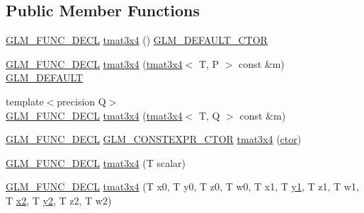 \subsection*{Public Member Functions}
\begin{DoxyCompactItemize}
\item 
\mbox{\hyperlink{setup_8hpp_ab2d052de21a70539923e9bcbf6e83a51}{G\+L\+M\+\_\+\+F\+U\+N\+C\+\_\+\+D\+E\+CL}} \mbox{\hyperlink{structglm_1_1tmat3x4_a2bef718978c799d94cb376b64e9cdfd1}{tmat3x4}} () \mbox{\hyperlink{setup_8hpp_afb97a4e995bc004c0cbbfa22125b80ba}{G\+L\+M\+\_\+\+D\+E\+F\+A\+U\+L\+T\+\_\+\+C\+T\+OR}}
\item 
\mbox{\hyperlink{setup_8hpp_ab2d052de21a70539923e9bcbf6e83a51}{G\+L\+M\+\_\+\+F\+U\+N\+C\+\_\+\+D\+E\+CL}} \mbox{\hyperlink{structglm_1_1tmat3x4_ab424019515d481478f47bac3d055f621}{tmat3x4}} (\mbox{\hyperlink{structglm_1_1tmat3x4}{tmat3x4}}$<$ T, P $>$ const \&m) \mbox{\hyperlink{setup_8hpp_aefce7051c376a64ba89fa93a9f63bc2c}{G\+L\+M\+\_\+\+D\+E\+F\+A\+U\+LT}}
\item 
{\footnotesize template$<$precision Q$>$ }\\\mbox{\hyperlink{setup_8hpp_ab2d052de21a70539923e9bcbf6e83a51}{G\+L\+M\+\_\+\+F\+U\+N\+C\+\_\+\+D\+E\+CL}} \mbox{\hyperlink{structglm_1_1tmat3x4_a7bb59eb4a55a89437df372f9cc6389e1}{tmat3x4}} (\mbox{\hyperlink{structglm_1_1tmat3x4}{tmat3x4}}$<$ T, Q $>$ const \&m)
\item 
\mbox{\hyperlink{setup_8hpp_ab2d052de21a70539923e9bcbf6e83a51}{G\+L\+M\+\_\+\+F\+U\+N\+C\+\_\+\+D\+E\+CL}} \mbox{\hyperlink{setup_8hpp_ad34178a09666081abdb573c14d1f4a5a}{G\+L\+M\+\_\+\+C\+O\+N\+S\+T\+E\+X\+P\+R\+\_\+\+C\+T\+OR}} \mbox{\hyperlink{structglm_1_1tmat3x4_a930782f1f709278737022337bd839e66}{tmat3x4}} (\mbox{\hyperlink{namespaceglm_a807df837905ec286f806a536af03b57f}{ctor}})
\item 
\mbox{\hyperlink{setup_8hpp_ab2d052de21a70539923e9bcbf6e83a51}{G\+L\+M\+\_\+\+F\+U\+N\+C\+\_\+\+D\+E\+CL}} \mbox{\hyperlink{structglm_1_1tmat3x4_a3a0ca2bde86e5e84185ae755d97f5f34}{tmat3x4}} (T scalar)
\item 
\mbox{\hyperlink{setup_8hpp_ab2d052de21a70539923e9bcbf6e83a51}{G\+L\+M\+\_\+\+F\+U\+N\+C\+\_\+\+D\+E\+CL}} \mbox{\hyperlink{structglm_1_1tmat3x4_a34d8a86482525e5100dea559991bba2e}{tmat3x4}} (T x0, T y0, T z0, T w0, T x1, T \mbox{\hyperlink{glad_8h_a48340161068d267815ac3131e9d03def}{y1}}, T z1, T w1, T \mbox{\hyperlink{glad_8h_ad2cea6eadb01f017f0d57e7edf0ce988}{x2}}, T \mbox{\hyperlink{glad_8h_af7158b5d27f7a6aa4ab9973fcc3a5c20}{y2}}, T z2, T w2)

\end{DoxyCompactItemize}
